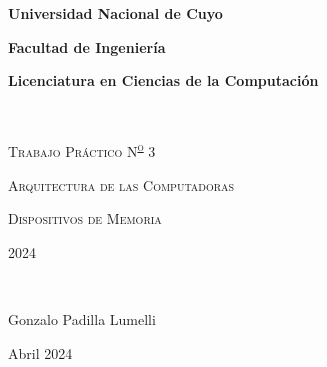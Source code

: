 {\centering
    {\bfseries\Large Universidad Nacional de Cuyo \par}
    \vspace{-0.2cm}
    {\bfseries\Large Facultad de Ingeniería \par}
    \vspace{-0.2cm}
    {\bfseries\Large Licenciatura en Ciencias de la Computación \par}
    \pagestyle{plain}
    \vfill
    \noindent\hrulefill \\
    {\scshape\Huge Trabajo Práctico N\textsuperscript{\Large\underline o} 3\par} %
    \vspace{0.5cm}
    {\scshape\Large Arquitectura de las Computadoras \par}
    {\scshape\Large Dispositivos de Memoria \par}
    {\scshape\large  \par}
    \vspace{0.5cm}
    {\scshape\Large 2024 \par} %
    \noindent\hrulefill \\
    \vspace{4cm}
    {\Large Gonzalo Padilla Lumelli \par}
    {\large Abril 2024 \par} %
    \vfill
    \setcounter{page}{1}
    \newpage
}